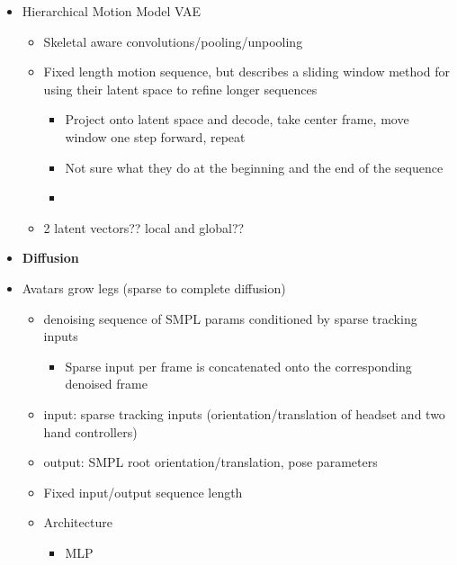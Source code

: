 \begin{itemize}
    \item Hierarchical Motion Model VAE \cite{HierarchicalMotionVAE}
    \begin{itemize}
        \item Skeletal aware convolutions/pooling/unpooling
        \item Fixed length motion sequence, but describes a sliding window method for using their latent space to refine longer sequences 
        \begin{itemize}
            \item Project onto latent space and decode, take center frame, move window one step forward, repeat
            \item Not sure what they do at the beginning and the end of the sequence
            \item 
        \end{itemize}
        \item 2 latent vectors?? local and global??
    \end{itemize}

    \item \textbf{Diffusion}
    \item Avatars grow legs (sparse to complete diffusion) \cite{AvatarsGrowLegs}
    \begin{itemize}
        \item denoising sequence of SMPL params conditioned by sparse tracking inputs
        \begin{itemize}
            \item Sparse input per frame is concatenated onto the corresponding denoised frame
        \end{itemize}
        \item input: sparse tracking inputs (orientation/translation of headset and two hand controllers)
        \item output: SMPL root orientation/translation, pose parameters
        \item Fixed input/output sequence length
        \item Architecture
        \begin{itemize}
            \item MLP
        \end{itemize}
    \end{itemize}


\end{itemize}
